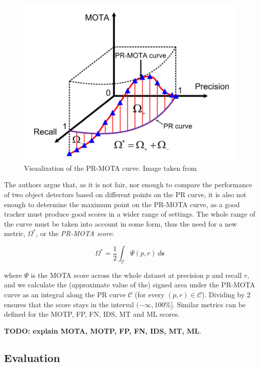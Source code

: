 \begin{figure}[h]
    \captionsetup{width=\textwidth}
    \includegraphics[width=\textwidth]{figures/pr-mota-curve.png}
    \caption{Visualization of the PR-MOTA curve. Image taken from \cite{CVIU_UA-DETRAC}}
    \label{fig:pr-mota}
\end{figure}

The authors argue that, as it is not fair, nor enough to compare the performance of two object detectors based on different points on the PR curve, it is also not enough to determine the maximum point on the PR-MOTA curve, as a good tracker must produce good scores in a wider range of settings. The whole range of the curve must be taken into account in some form, thus the need for a new metric, $\Omega^{*}$, or the \textit{PR-MOTA score}:

\[ \Omega^{*} = \frac{1}{2}\int_{\mathcal{C}} \Psi(p, r) \,d\textbf{s} \]

where $\Psi$ is the MOTA score across the whole dataset at precision $p$ and recall $r$, and we calculate the (approximate value of the) signed area under the PR-MOTA curve as an integral along the PR curve $\mathcal{C}$ (for every $(p, r) \in \mathcal{C}$). Dividing by 2 ensures that the score stays in the interval $(-\infty, 100\%]$. Similar metrics can be defined for the MOTP, FP, FN, IDS, MT and ML scores.

\textbf{TODO: explain MOTA, MOTP, FP, FN, IDS, MT, ML}.

\subsection{Evaluation}

